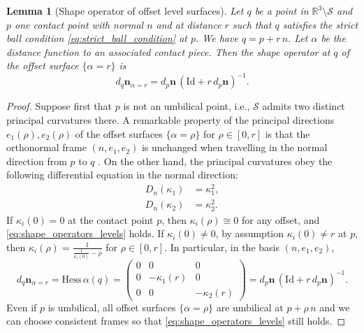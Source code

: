 \documentclass[11pt]{article}
\newcommand{\R}{\mathbb{R}}
\newcommand{\nbf}{\mathbf{n}}
\newcommand{\kap}{\kappa}
\newcommand{\Surf}{\mathcal{S}}
\newcommand{\Hess}{\mathrm{Hess}}
\newcommand{\Id}{\mathrm{Id}}
\theoremstyle{plain}
\newtheorem{lem}{Lemma}
\theoremstyle{definition}
\theoremstyle{remark}
\begin{document}
\begin{lem}[Shape operator of offset level surfaces]
	\label{lem:shape_operators_levels}
	Let $q$ be a point in $\R^3 \setminus \Surf$ and $p$ one contact point with normal $n$ and at distance $r$ such that $q$ satisfies the strict ball condition  \eqref{eq:strict_ball_condition} at $p$. We have $q = p + r\,n$. Let $\alpha$ be the distance function to an associated contact piece.
	Then the shape operator at $q$ of the offset surface $\{\alpha = r\}$ is
	\begin{equation}
		\label{eq:shape_operators_levels}
		d_q \nbf_{\alpha = r} = d_{p} \nbf \, (\Id + r \, d_{p} \nbf )^{-1}.
	\end{equation}
\end{lem}
\begin{proof}
	Suppose first that $p$ is not an umbilical point, i.e., $\Surf$ admits two distinct principal curvatures there. A remarkable property of the principal directions $e_1(\rho), e_2(\rho)$ of the offset surfaces $\{\alpha = \rho\}$ for $\rho \in [0,r]$ is that the orthonormal frame $(n, e_1, e_2)$ is unchanged when travelling in the normal direction from $p$ to $q$ \citep{mayost_applications_2014}. On the other hand, the principal curvatures obey the following differential equation in the normal direction:
	\begin{align*}
		D_n(\kap_1) &= \kap_1^2, \\
		D_n(\kap_2) &= \kap_2^2.
	\end{align*}
	If $\kap_i(0) = 0$ at the contact point $p$, then $\kap_i(\rho) \cong 0$ for any offset, and \cref{eq:shape_operators_levels} holds. If $\kap_i(0) \neq 0$, by assumption $\kap_i(0) \neq r$ at $p$, then $\kap_i(\rho) = \frac{1}{\frac{1}{\kap_i(0)} - \rho}$ for $\rho \in [0,r]$. In particular,
	in the basis $(n, e_1, e_2)$,
	\[d_q \nbf_{\alpha = r} = \Hess \, \alpha (q) = 
	\begin{pmatrix}
		0 & 0 & 0 \\
		0 & -\kap_1(r) & 0 \\
		0 & 0 & -\kap_2(r) 
	\end{pmatrix} = d_{p} \nbf \, (\Id + r \, d_{p} \nbf )^{-1}.\]
	Even if $p$ is umbilical, all offset surfaces $\{\alpha = \rho\}$ are umbilical at $p + \rho \, n$ and we can choose consistent frames so that \cref{eq:shape_operators_levels} still holds.
\end{proof}
\end{document}
